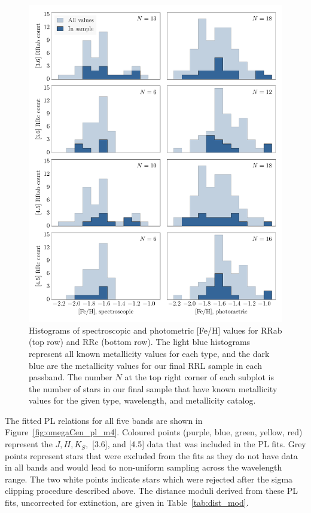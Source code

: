 \documentclass[a4paper,fleqn,usenatbib]{mnras}
\begin{document}
\begin{figure}
\begin{center}
\includegraphics[width=160mm]{reworked_fitting_code/final_plots/metallicity_hists.pdf}
\caption{Histograms of spectroscopic \citep[left column]{2006ApJ...640L..43S} and photometric \citep[right column]{2000AJ....119.1824R} [Fe/H] values for RRab (top row) and RRc (bottom row). The light blue histograms represent all known metallicity values for each type, and the dark blue are the metallicity values for our final RRL sample in each passband. The number $N$ at the top right corner of each subplot is the number of stars in our final sample that have known metallicity values for the given type, wavelength, and metallicity catalog.}
\label{fig:metallicity_hists}
\end{center}
\end{figure}

The fitted PL relations for all five bands are shown in Figure~\ref{fig:omegaCen_pl_m4}. Coloured points (purple, blue, green, yellow, red) represent the $J, H, K_S,$ [3.6], and [4.5] data that was included in the PL fits. Grey points represent stars that were excluded from the fits as they do not have data in all bands and would lead to non-uniform sampling across the wavelength range. The two white points indicate stars which were rejected after the sigma clipping procedure described above. The distance moduli derived from these PL fits, uncorrected for extinction, are given in Table~\ref{tab:dist_mod}.
\end{document}
